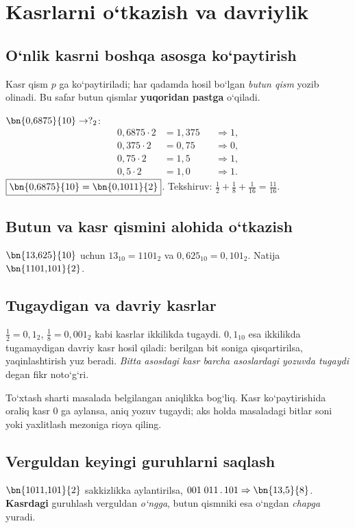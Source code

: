 \documentclass[11pt,a4paper,openany,oneside]{book}
\begin{document}
\chapter{Kasrlarni o‘tkazish va davriylik}
\section{O‘nlik kasrni boshqa asosga ko‘paytirish}
Kasr qism \(p\) ga ko‘paytiriladi; har qadamda hosil bo‘lgan \emph{butun qism} yozib olinadi. Bu safar butun qismlar \textbf{yuqoridan pastga} o‘qiladi. 
\begin{worked}
\(\bn{0{,}6875}{10}\to ?_2\):
\[\begin{aligned}
0{,}6875\cdot2&=1{,}375 &&\Rightarrow 1,\\
0{,}375\cdot2&=0{,}75 &&\Rightarrow 0,\\
0{,}75\cdot2&=1{,}5 &&\Rightarrow 1,\\
0{,}5\cdot2&=1{,}0 &&\Rightarrow 1.
\end{aligned}\]
\(\boxed{\bn{0{,}6875}{10}=\bn{0{,}1011}{2}}\). Tekshiruv: \(\tfrac12+\tfrac18+\tfrac1{16}=\tfrac{11}{16}\).
\end{worked}
\section{Butun va kasr qismini alohida o‘tkazish}
\(\bn{13{,}625}{10}\) uchun \(13_{10}=1101_2\) va \(0{,}625_{10}=0{,}101_2\). Natija \(\bn{1101{,}101}{2}\).
\section{Tugaydigan va davriy kasrlar}
\(\tfrac12=0{,}1_2\), \(\tfrac18=0{,}001_2\) kabi kasrlar ikkilikda tugaydi. \(0{,}1_{10}\) esa ikkilikda tugamaydigan davriy kasr hosil qiladi: berilgan bit soniga qisqartirilsa, yaqinlashtirish yuz beradi. \emph{Bitta asosdagi kasr barcha asoslardagi yozuvda tugaydi} degan fikr noto‘g‘ri.
\begin{important}
To‘xtash sharti masalada belgilangan aniqlikka bog‘liq. Kasr ko‘paytirishida oraliq kasr 0 ga aylansa, aniq yozuv tugaydi; aks holda masaladagi bitlar soni yoki yaxlitlash mezoniga rioya qiling.
\end{important}
\section{Verguldan keyingi guruhlarni saqlash}
\(\bn{1011{,}101}{2}\) sakkizlikka aylantirilsa, \(001\;011\,.\,101\Rightarrow\bn{13{,}5}{8}\). \textbf{Kasrdagi} guruhlash verguldan \emph{o‘ngga}, butun qismniki esa o‘ngdan \emph{chapga} yuradi.
\end{document}
